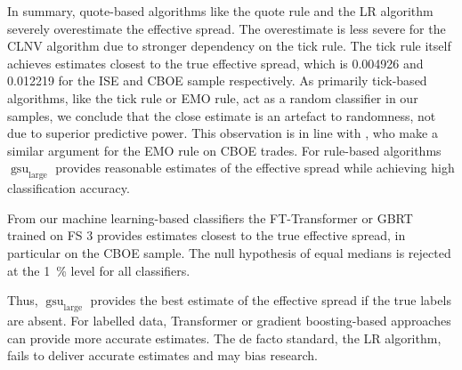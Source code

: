 In summary, quote-based algorithms like the quote rule and the \gls{LR} algorithm severely overestimate the effective spread. The overestimate is less severe for the \gls{CLNV} algorithm due to stronger dependency on the tick rule. The tick rule itself achieves estimates closest to the true effective spread, which is \num[round-mode=places, round-precision=3]{0.004926} and \num[round-mode=places, round-precision=3]{0.012219} for the \gls{ISE} and \gls{CBOE} sample respectively. As primarily tick-based algorithms, like the tick rule or \gls{EMO} rule, act as a random classifier in our samples, we conclude that the close estimate is an artefact to randomness, not due to superior predictive power. This observation is in line with \textcite[][897]{savickasInferringDirectionOption2003}, who make a similar argument for the \gls{EMO} rule on \gls{CBOE} trades. For rule-based algorithms $\operatorname{gsu}_{\mathrm{large}}$ provides reasonable estimates of the effective spread while achieving high classification accuracy.

From our machine learning-based classifiers the FT-Transformer or \gls{GBRT} trained on \gls{FS} 3 provides estimates closest to the true effective spread, in particular on the \gls{CBOE} sample. The null hypothesis of equal medians is rejected at the \SI{1}{\percent} level for all classifiers.

Thus, $\operatorname{gsu}_{\mathrm{large}}$ provides the best estimate of the effective spread if the true labels are absent. For labelled data, Transformer or gradient boosting-based approaches can provide more accurate estimates. The de facto standard, the \gls{LR} algorithm, fails to deliver accurate estimates and may bias research.
